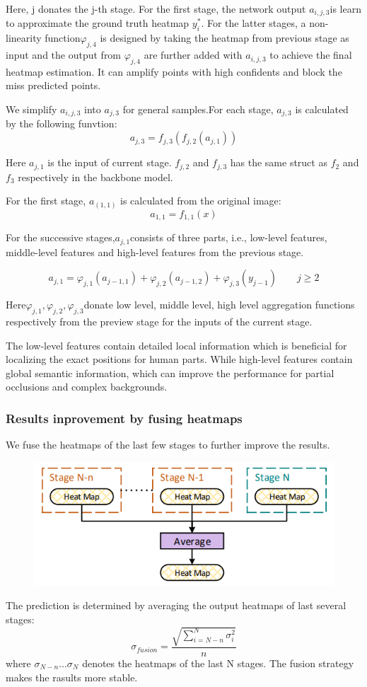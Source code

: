 \documentclass[11pt]{article}
\begin{document}
Here, j donates the j-th stage. For the first stage, the network output $a_{i,j,3}$is learn to approximate the ground truth heatmap $y_i^*$. For the latter stages, a non-linearity function$\varphi_{j,4}$ is designed by taking the heatmap from previous stage as input and the output from $\varphi_{j,4}$ are further added with $a_{i,j,3}$ to achieve the final heatmap estimation. It can amplify points with high confidents and block the miss predicted points.

We simplify $a_{i,j,3}$ into $a_{j,3}$ for general samples.For each stage, $a_{j,3}$ is calculated by the following funvtion:
$$a_{j,3} = f_{j,3}(f_{j,2}(a_{j,1}))$$

Here $a_{j,1}$ is the input of current stage. $f_{j,2}$ and $f_{j,3}$ has the same struct as $f_2$ and $f_3$ respectively in the backbone model.

For the first stage, $a_(1,1)$ is calculated from the original image:$$a_{1,1} = f_{1,1}(x)$$

For the successive stages,$a_{j,1}$consists of three parts, i.e., low-level features, middle-level features and high-level features from the previous stage.

$$a_{j,1} = \varphi_{j,1}(a_{j-1,1})+\varphi_{j,2}(a_{j-1,2})+\varphi_{j,3}(y_{j-1}) \qquad j\geq2$$

Here$\varphi_{j,1},\varphi_{j,2},\varphi_{j,3}$donate low level, middle level, high level aggregation functions respectively from the preview stage for the inputs of the current stage.

The low-level features contain detailed local information which is beneficial for localizing the exact positions for human parts. While high-level features contain global semantic information, which can improve the performance for partial occlusions and complex backgrounds.

\subsubsection{Results inprovement by fusing heatmaps}
We fuse the heatmaps of the last few stages to further improve the results.
\begin{figure}[h]
	\centering
	\includegraphics[scale = 0.5]{52}
\end{figure}
The prediction is determined by averaging the output heatmaps of last several stages:
$$\sigma_{fusion} = \frac{\sqrt{\sum_{i=N-n}^{N}\sigma_i^2}}{n}$$
where $\sigma_{N-n}...\sigma_N$ denotes the heatmaps of the last N stages. The fusion strategy makes the rasults more stable.
\end{document}
